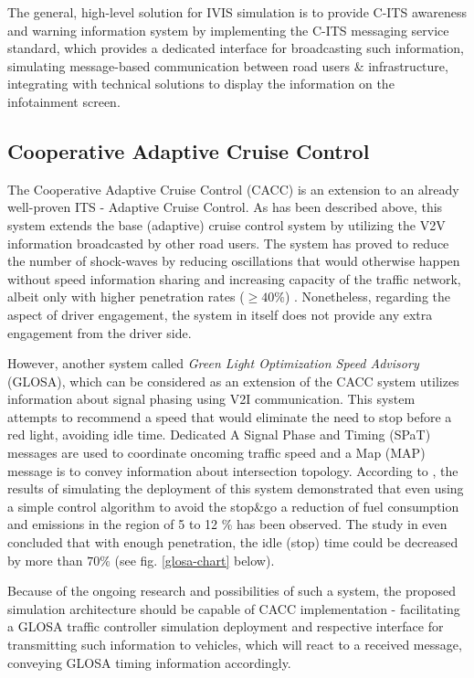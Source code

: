 \documentclass[main.tex]{subfiles}
\begin{document}
The general, high-level solution for IVIS simulation is to provide C-ITS awareness and warning information system by 
implementing the C-ITS messaging service standard, which provides a dedicated interface for broadcasting such information,
simulating message-based communication between road users \& infrastructure, integrating with
technical solutions to display the information on the infotainment screen.

\subsection{Cooperative Adaptive Cruise Control}

The Cooperative Adaptive Cruise Control (CACC) is an extension to an already well-proven ITS -
Adaptive Cruise Control.  As has been described above, this system extends the base (adaptive)
cruise control system by utilizing the V2V information broadcasted by other road users. The
system has proved to reduce the number of shock-waves by reducing oscillations that would
otherwise happen without speed information sharing and increasing capacity of the traffic
network, albeit only with higher penetration rates ($\ge 40\%$) \cite{van_Arem_2006}. Nonetheless,
regarding the aspect of driver engagement, the system in itself does not provide any
extra engagement from the driver side. 

However, another system called \emph{Green Light Optimization Speed Advisory} (GLOSA), which
can be considered as an extension of the CACC system utilizes information about signal phasing
using V2I communication. This system attempts to recommend a speed that would eliminate the
need to stop before a red light, avoiding idle time. Dedicated A Signal Phase and Timing (SPaT)
messages are used to coordinate oncoming traffic speed and a Map (MAP) message is to convey
information about intersection topology. According to \cite{Pariota_2019}, the results of
simulating the deployment of this system demonstrated that even using a simple control algorithm
to avoid the stop\&go a reduction of fuel consumption and emissions in the region
of 5 to 12 \% has been observed. The study in \cite{Katsaros_2011} even concluded that with
enough penetration, the idle (stop) time could be decreased by more than $70 \%$ (see fig.
\ref{glosa-chart} below).

Because of the ongoing research and possibilities of such a system, the proposed simulation architecture 
should be capable of CACC implementation - facilitating a GLOSA traffic controller simulation deployment
and respective interface for transmitting such information to vehicles, which will react to a received 
message, conveying GLOSA timing information accordingly. 
\end{document}

